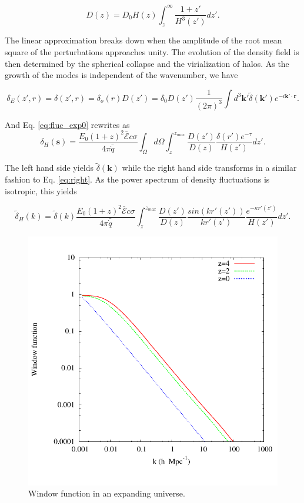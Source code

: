 \documentclass[twocolumns]{emulateapj}
\begin{document}
\begin{equation}
  \label{eq:growth_1}
  D(z)=D_0H(z)\int_z^{\infty}\frac{1+z'}{H^3(z')}dz'.
\end{equation}

The linear approximation breaks down when the amplitude of the root mean square of the perturbations approaches unity. The evolution of the density field is then determined by the spherical collapse \citep{1972ApJ...176....1G} and the virialization of halos. As the growth of the modes is independent of the wavenumber, we have

\begin{equation}
  \label{eq:FT_delta}
  \delta_E(z',r)=\delta(z',r)=\delta_o(r)D(z')=\delta_0D(z')\frac{1}{(2\pi)^3}\int d^3\mathbf{k'} \tilde{\delta}(\mathbf{k'}) e^{-i\mathbf{k'}\cdot\mathbf{r}}.
\end{equation}


And Eq. \ref{eq:fluc_exp0}  rewrites as
\begin{equation}
  \label{eq:heat_fluc_exp0}
  \delta_H(\mathbf{s})=\frac{ E_0(1+z)^2 \bar{\mathcal{E}} c\sigma}{4\pi\bar{\dot{q}}} \int_{\Omega}d\Omega\int_z^{z_{max}}  \frac{D(z')}{D(z)} \frac{\delta(r') e^{-\tau}}{H(z')}dz'.
\end{equation}


The left hand side yields $\tilde{\delta}(\mathbf{k})$ while the right hand side transforms in a similar fashion to Eq. \ref{eq:right}. As the power spectrum of density fluctuations is isotropic, this  yields

\begin{equation}
  \label{eq:heat_fluc_exp1}
  \tilde{\delta}_H(k)=\tilde{\delta}(k) \frac{E_0(1+z)^2\bar{\mathcal{E}}c\sigma}{4\pi\bar{\dot{q}}} \int_z^{z_{max}} \frac{D(z')}{D(z)}\frac{sin(kr'(z'))}{kr'(z')}    \frac{e^{-\kappa r'(z')}} {H(z')}  dz'.
\end{equation}

\begin{figure}[h]
  \centering
  \includegraphics[width = .45\textwidth ]{window_nobiases-eps-converted-to}
  \caption{Window function in an expanding universe.}
  \label{fig:window_nobiases}
\end{figure}
\end{document}
